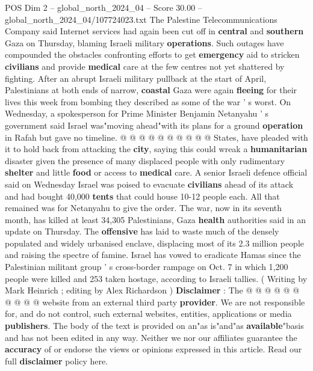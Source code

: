 \begin{textsample}{POS Dim 2 – global\_north\_2024\_04 – Score 30.00 – global\_north\_2024\_04/107724023.txt}
The Palestine Telecommunications Company said Internet services had again been cut off in \textbf{central} and \textbf{southern} Gaza on Thursday, blaming Israeli military \textbf{operations}.
Such outages have compounded the obstacles confronting efforts to get \textbf{emergency} aid to stricken \textbf{civilians} and provide \textbf{medical} care at the few centres not yet shattered by fighting.
After an abrupt Israeli military pullback at the start of April, Palestinians at both ends of narrow, \textbf{coastal} Gaza were again \textbf{fleeing} for their lives this week from bombing they described as some of the war ' s worst.
On Wednesday, a spokesperson for Prime Minister Benjamin Netanyahu ' s government said Israel was"moving ahead"with its plans for a ground \textbf{operation} in Rafah but gave no timeline. @ @ @ @ @ @ @ @ @ @ States, have pleaded with it to hold back from attacking the \textbf{city}, saying this could wreak a \textbf{humanitarian} disaster given the presence of many displaced people with only rudimentary \textbf{shelter} and little \textbf{food} or access to \textbf{medical} care.
A senior Israeli defence official said on Wednesday Israel was poised to evacuate \textbf{civilians} ahead of its attack and had bought 40,000 \textbf{tents} that could house 10-12 people each.
All that remained was for Netanyahu to give the order.
The war, now in its seventh month, has killed at least 34,305 Palestinians, Gaza \textbf{health} authorities said in an update on Thursday.
The \textbf{offensive} has laid to waste much of the densely populated and widely urbanised enclave, displacing most of its 2.3 million people and raising the spectre of famine.
Israel has vowed to eradicate Hamas since the Palestinian militant group ' s cross-border rampage on Oct. 7 in which 1,200 people were killed and 253 taken hostage, according to Israeli tallies. ( Writing by Mark Heinrich ; editing by Alex Richardson ) \textbf{Disclaimer} : The @ @ @ @ @ @ @ @ @ @ website from an external third party \textbf{provider}.
We are not responsible for, and do not control, such external websites, entities, applications or media \textbf{publishers}.
The body of the text is provided on an"as is"and"as \textbf{available}"basis and has not been edited in any way.
Neither we nor our affiliates guarantee the \textbf{accuracy} of or endorse the views or opinions expressed in this article.
Read our full \textbf{disclaimer} policy here.

\end{textsample}
